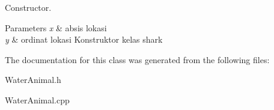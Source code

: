 Constructor. 


\begin{DoxyParams}{Parameters}
{\em x} & absis lokasi \\
\hline
{\em y} & ordinat lokasi Konstruktor kelas shark \\
\hline
\end{DoxyParams}


The documentation for this class was generated from the following files\+:\begin{DoxyCompactItemize}
\item 
Water\+Animal.\+h\item 
Water\+Animal.\+cpp\end{DoxyCompactItemize}
